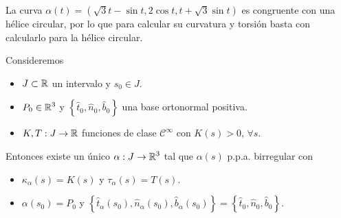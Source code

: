 \begin{eg}
La curva $\displaystyle \alpha\left(t\right)=\left(\sqrt{3}t - \sin t, 2 \cos t, t + \sqrt{3}\sin t\right) $ es congruente con una hélice circular, por lo que para calcular su curvatura y torsión basta con calcularlo para la hélice circular. 
\end{eg}
\begin{theorem}
	Consideremos
	\begin{itemize}
	\item $\displaystyle J \subset \mathbb{R} $ un intervalo y $\displaystyle s_{0} \in J $.
	\item $\displaystyle P_{0} \in \mathbb{R}^{3} $ y $\displaystyle \left\{ \hat{t}_{0}, \hat{n}_{0}, \hat{b}_{0}\right\}  $ una base ortonormal positiva.
	\item $\displaystyle K, T : J \to \mathbb{R} $ funciones de clase $\displaystyle \mathcal{C}^{\infty} $ con $\displaystyle K\left(s\right) > 0 $, $\displaystyle \forall s $.
	\end{itemize}
	Entonces existe un único $\displaystyle \alpha : J \to \mathbb{R}^{3} $ tal que $\displaystyle \alpha\left(s\right) $ p.p.a. birregular con 
	\begin{itemize}
	\item $\displaystyle \kappa_{\alpha }\left(s\right)=K\left(s\right) $ y $\displaystyle \tau_{\alpha }\left(s\right)=T\left(s\right) $.
	\item $\displaystyle \alpha\left(s_{0}\right)=P_{0} $ y $\displaystyle \left\{ \hat{t}_{\alpha }\left(s_{0}\right), \hat{n}_{\alpha }\left(s_{0}\right), \hat{b}_{\alpha }\left(s_{0}\right)\right\} = \left\{ \hat{t}_{0}, \hat{n}_{0}, \hat{b}_{0}\right\}  $.
	\end{itemize}
\end{theorem}
